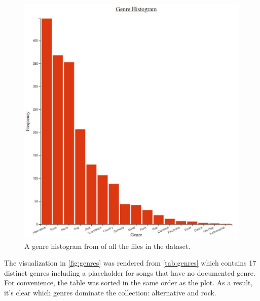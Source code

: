 \documentclass[journal]{vgtc}                %
\begin{document}
\begin{figure}[h]
 \centering %
 \includegraphics[width=\columnwidth]{genre-histogram}
 \caption{A genre histogram from \cite{Grifski:2019:Histogram} of all the files in the dataset.}
 \label{fig:genres}
\end{figure}

The visualization in \autoref{fig:genres} was rendered from \autoref{tab:genres}
which contains 17 distinct genres including a placeholder for songs that have
no documented genre. For convenience, the table was sorted in the same order
as the plot. As a result, it's clear which genres dominate the collection:
alternative and rock.
\end{document}
